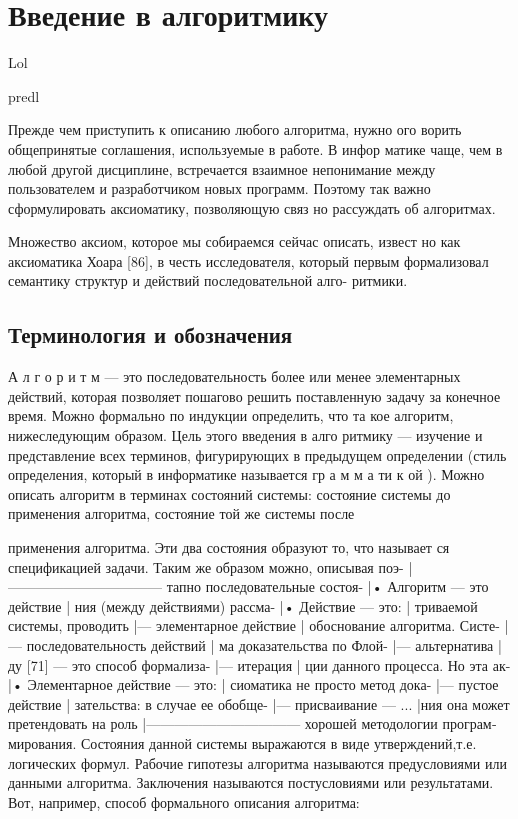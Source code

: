 \documentclass{mai_book}
\begin{document}
	\section{Введение в алгоритмику}
	
	\begin{beznomera}
	Lol
	\end{beznomera}
	
	predl
	
	
	Прежде чем приступить к описанию любого алгоритма, нужно ого­
	ворить общепринятые соглашения, используемые в работе. В инфор­
	матике чаще, чем в любой другой дисциплине, встречается взаимное
	непонимание между пользователем и разработчиком новых программ.
	Поэтому так важно сформулировать аксиоматику, позволяющую связ­
	но рассуждать об алгоритмах.

	Множество аксиом, которое мы собираемся сейчас описать, извест­
	но как аксиоматика Хоара [86], в честь исследователя, который первым
	формализовал семантику структур и действий последовательной алго-
	ритмики.

	\subsection{Терминология и обозначения}
	
	А л г о р и т м — это последовательность более или менее элементарных
	действий, которая позволяет пошагово решить поставленную задачу за
	конечное время. Можно формально по индукции определить, что та­
	кое алгоритм, нижеследующим образом. Цель этого введения в алго­
	ритмику — изучение и представление всех терминов, фигурирующих в
	предыдущем определении (стиль определения, который в информатике
	называется гр а м м а ти к ой ).
	Можно описать алгоритм в терминах состояний системы: состояние
	системы до применения алгоритма, состояние той же системы после
	
	\pagebreak
	
	применения алгоритма. Эти два состояния образуют то, что называет­
	ся спецификацией задачи. Таким же образом можно, описывая поэ-
|--------------------------------- тапно последовательные состоя-
|• Алгоритм — это действие       | ния (между действиями) рассма-
|• Действие — это:               | триваемой системы, проводить
|— элементарное действие         | обоснование алгоритма. Систе-
|— последовательность действий   | ма доказательства по Флой-  
|— альтернатива                  | ду [71] — это способ формализа-
|— итерация                      | ции данного процесса. Но эта ак-
|•  Элементарное действие — это: | сиоматика не просто метод дока-
|—  пустое действие              | зательства: в случае ее обобще-
|— присваивание  — ...           |ния  она может претендовать  на роль
|--------------------------------- хорошей  методологии програм­
мирования.
\parindent=1cm Состояния данной  системы  выражаются  в  виде 
утверждений,т.е. логических   формул. Рабочие гипотезы алгоритма называются 
предусловиями или данными алгоритма.  Заключения  называются постусловиями 
или результатами. Вот,   например,   способ формального описания алгоритма:
\end{document}
